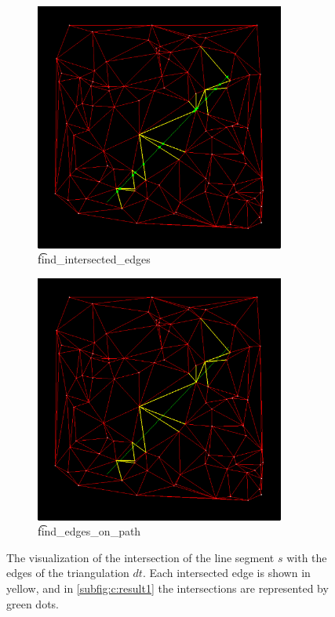 \begin{figure}
	\centering
	\begin{subfigure}[b]{0.45\textwidth}
		\centering
		\includegraphics[width=0.9\textwidth]{./img/c_result1}
		\caption{\t{find_intersected_edges}}
		\label{subfig:c:result1}
	\end{subfigure}
	\begin{subfigure}[b]{0.45\textwidth}
		\centering
		\includegraphics[width=0.9\textwidth]{./img/c_result2}
		\caption{\t{find_edges_on_path}}
		\label{subfig:c:result2}
	\end{subfigure}	
	\caption{The visualization of the intersection of the line segment $s$ with the edges of the triangulation $dt$. Each intersected edge is shown in yellow, and in \autoref{subfig:c:result1} the intersections are represented by green dots.}
	\label{fig:c:result}
\end{figure}

